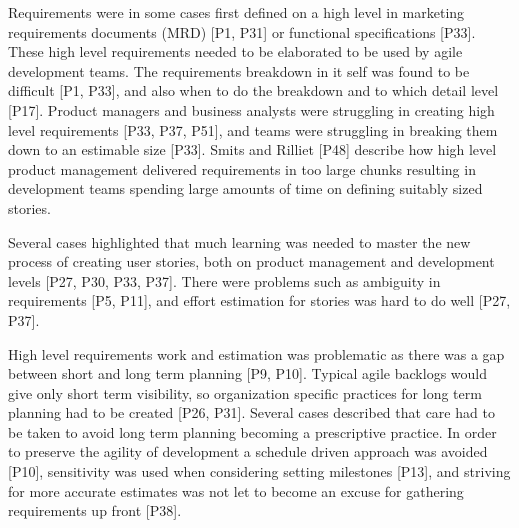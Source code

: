 \documentclass[preprint,authoryear,12pt]{elsarticle}
\begin{document}
Requirements were in some cases first defined on a high level in marketing
requirements documents (MRD) [P1, P31] or functional specifications [P33].
These high level requirements needed to be elaborated to be used by agile
development teams. The requirements breakdown in it self was found to be
difficult [P1, P33], and also when to do the breakdown and to which detail level
[P17].
Product managers and business analysts were struggling in creating high level
requirements [P33, P37, P51], and teams were struggling in breaking them down to an
estimable size [P33]. Smits and Rilliet [P48] describe how high level product
management delivered requirements in too large chunks resulting in development
teams spending large amounts of time on defining suitably sized stories.

Several cases highlighted that much learning was needed to master the new
process of creating user stories, both on product management and development
levels [P27, P30, P33, P37]. There were problems such as ambiguity in
requirements [P5, P11], and effort estimation for stories was hard to do well
[P27, P37].




High level requirements work and estimation was problematic as there was a gap
between short and long term planning [P9, P10]. Typical agile backlogs would
give only short term visibility, so organization specific practices for long
term planning had to be created [P26, P31]. Several cases described that care
had to be taken to avoid long term planning becoming a prescriptive practice. In
order to preserve the agility of development a schedule driven approach was
avoided [P10], sensitivity was used when considering setting milestones [P13],
and striving for more accurate estimates was not let to become an excuse for
gathering requirements up front [P38].

\end{document}
